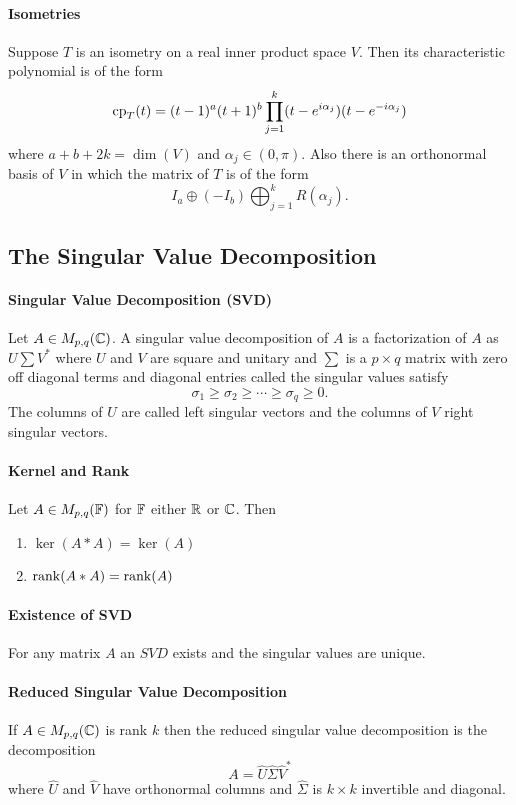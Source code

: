 \paragraph{Isometries}
Suppose \(T\) is an isometry on a real inner product space \(V\). Then its characteristic polynomial is of the form
\[\mathrm{cp}_T(t) = (t-1)^a(t+1)^b \prod_{j=1}^k(t - e^{i\alpha_j})(t-e^{-i\alpha_j})\]
where \(a + b + 2k = \dim(V)\) and \(\alpha_j \in (0 , \pi)\). Also there is an orthonormal basis of \(V\) in which the matrix of \(T\) is of the form
\[I_a \oplus (-I_b) \bigoplus_{j=1}^k R(\alpha_j).\]

\subsection{The Singular Value Decomposition}
\paragraph{Singular Value Decomposition (SVD)}
Let \(A \in M_{p,q}(\mathbb{C})\). A singular value decomposition of \(A\) is a factorization of \(A\) as \(U\sum V^*\) where \(U\) and \(V\) are square and unitary and \(\sum\) is a \(p \times q\) matrix with zero off diagonal terms and diagonal entries called the singular values satisfy
\[\sigma_1 \geq \sigma_2 \geq \cdots \geq \sigma_q \geq 0.\]
The columns of \(U\) are called left singular vectors and the columns of \(V\) right singular vectors.

\paragraph{Kernel and Rank}
Let \(A \in M_{p,q}(\mathbb{F})\) for \(\mathbb{F}\) either \(\mathbb{R}\) or \(\mathbb{C}\). Then
\begin{enumerate}[label = \alph*)]
    \item \(\ker(A*A) = \ker(A)\)
    \item \(\rank(A*A) = \rank(A)\)
\end{enumerate}

\paragraph{Existence of SVD}
For any matrix \(A\) an \(SVD\) exists and the singular values are unique.

\paragraph{Reduced Singular Value Decomposition}
If \(A \in M_{p,q}(\mathbb{C})\) is rank \(k\) then the reduced singular value decomposition is the decomposition
\[A = \hat{U}\hat{\Sigma}\hat{V}^*\]
where \(\hat{U}\) and \(\hat{V}\) have orthonormal columns and \(\hat{\Sigma}\) is \(k \times k\) invertible and diagonal.

